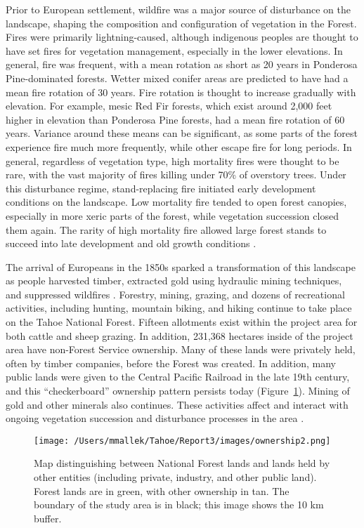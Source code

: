 Prior to European settlement, wildfire was a major source of disturbance on the landscape, shaping the composition and configuration of vegetation in the Forest. Fires were primarily lightning-caused, although indigenous peoples are thought to have set fires for vegetation management, especially in the lower elevations. In general, fire was frequent, with a mean rotation as short as 20 years in Ponderosa Pine-dominated forests. Wetter mixed conifer areas are predicted to have had a mean fire rotation of 30 years. Fire rotation is thought to increase gradually with elevation. For example, mesic Red Fir forests, which exist around 2,000 feet higher in elevation than Ponderosa Pine forests, had a mean fire rotation of 60 years. Variance around these means can be significant, as some parts of the forest experience fire much more frequently, while other escape fire for long periods. In general, regardless of vegetation type, high mortality fires were thought to be rare, with the vast majority of fires killing under 70\% of overstory trees. Under this disturbance regime, stand-replacing fire initiated early development conditions on the landscape. Low mortality fire tended to open forest canopies, especially in more xeric parts of the forest, while vegetation succession closed them again. The rarity of high mortality fire allowed large forest stands to succeed into late development and old growth conditions \citep{SNEP1996,Mallek2013,Safford2014,SNEP1996a}.

The arrival of Europeans in the 1850s sparked a transformation of this landscape as people harvested timber, extracted gold using hydraulic mining techniques, and suppressed wildfires \citep{Storer1963}. Forestry, mining, grazing, and dozens of recreational activities, including hunting, mountain biking, and hiking continue to take place on the Tahoe National Forest. Fifteen allotments exist within the project area for both cattle and sheep grazing. In addition, 231,368 hectares inside of the project area have non-Forest Service ownership. Many of these lands were privately held, often by timber companies, before the Forest was created. In addition, many public lands were given to the Central Pacific Railroad in the late 19th century, and this ``checkerboard'' ownership pattern persists today (Figure~\ref{ownership}). Mining of gold and other minerals also continues. These activities affect and interact with ongoing vegetation succession and disturbance processes in the area \citep{USDAForestService2014}.

\begin{figure}[!htbp]
\centering
\texttt{[image: /Users/mmallek/Tahoe/Report3/images/ownership2.png]}
\caption{Map distinguishing between National Forest lands and lands held by other entities (including private, industry, and other public land). Forest lands are in green, with other ownership in tan. The boundary of the study area is in black; this image shows the 10 km buffer.} 
\label{ownership}
\end{figure}

